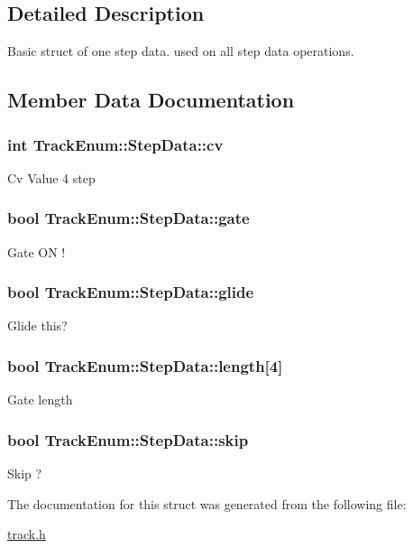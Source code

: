 \subsection{Detailed Description}
Basic struct of one step data. used on all step data operations. 

\subsection{Member Data Documentation}
\hypertarget{structTrackEnum_1_1StepData_ace50a5d33cf24a4e6f6b91cc97b85643}{
\subsubsection[{cv}]{\setlength{\rightskip}{0pt plus 5cm}int Track\-Enum\-::\-Step\-Data\-::cv}}\label{structTrackEnum_1_1StepData_ace50a5d33cf24a4e6f6b91cc97b85643}
Cv Value 4 step \hypertarget{structTrackEnum_1_1StepData_aa3df1cd3696c931e7b6195155de793b1}{
\subsubsection[{gate}]{\setlength{\rightskip}{0pt plus 5cm}bool Track\-Enum\-::\-Step\-Data\-::gate}}\label{structTrackEnum_1_1StepData_aa3df1cd3696c931e7b6195155de793b1}
Gate O\-N ! \hypertarget{structTrackEnum_1_1StepData_a63ba552973c563c9b677f6be06d5a01d}{
\subsubsection[{glide}]{\setlength{\rightskip}{0pt plus 5cm}bool Track\-Enum\-::\-Step\-Data\-::glide}}\label{structTrackEnum_1_1StepData_a63ba552973c563c9b677f6be06d5a01d}
Glide this? \hypertarget{structTrackEnum_1_1StepData_a5f859558e1945dea556c102912e27411}{
\subsubsection[{length}]{\setlength{\rightskip}{0pt plus 5cm}bool Track\-Enum\-::\-Step\-Data\-::length\mbox{[}4\mbox{]}}}\label{structTrackEnum_1_1StepData_a5f859558e1945dea556c102912e27411}
Gate length \hypertarget{structTrackEnum_1_1StepData_abbd1dda2c86c1aacc7c5cbe2b03f0e52}{
\subsubsection[{skip}]{\setlength{\rightskip}{0pt plus 5cm}bool Track\-Enum\-::\-Step\-Data\-::skip}}\label{structTrackEnum_1_1StepData_abbd1dda2c86c1aacc7c5cbe2b03f0e52}
Skip ? 

The documentation for this struct was generated from the following file\-:\begin{DoxyCompactItemize}
\item 
\hyperlink{track_8h}{track.\-h}\end{DoxyCompactItemize}
